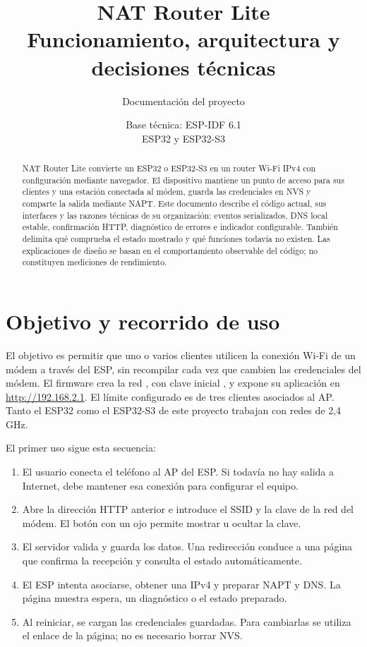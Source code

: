 \documentclass[11pt,a4paper]{article}
\title{\textbf{NAT Router Lite}\\[0.4em]
  \large Funcionamiento, arquitectura y decisiones técnicas}
\author{Documentación del proyecto}
\date{Base técnica: ESP-IDF 6.1\\ESP32 y ESP32-S3}
\newcommand{\code}[1]{\texttt{\detokenize{#1}}}
\begin{document}
\maketitle
\begin{abstract}
NAT Router Lite convierte un ESP32 o ESP32-S3 en un router Wi-Fi IPv4
con configuración mediante navegador. El dispositivo mantiene un punto
de acceso para sus clientes y una estación conectada al módem, guarda las
credenciales en NVS y comparte la salida mediante NAPT. Este documento
describe el código actual, sus interfaces y las razones técnicas de su
organización: eventos serializados, DNS local estable, confirmación HTTP,
diagnóstico de errores e indicador configurable. También delimita qué
comprueba el estado mostrado y qué funciones todavía no existen.
Las explicaciones de diseño se basan en el comportamiento observable del
código; no constituyen mediciones de rendimiento.
\end{abstract}
\tableofcontents
\clearpage

\section{Objetivo y recorrido de uso}
\label{sec:uso}

El objetivo es permitir que uno o varios clientes utilicen la conexión
Wi-Fi de un módem a través del ESP, sin recompilar cada vez que cambien
las credenciales del módem. El firmware crea la red \code{ESP32-NAT}, con
clave inicial \code{12345678}, y expone su aplicación en
\url{http://192.168.2.1}. El límite configurado es de tres clientes
asociados al AP. Tanto el ESP32 como el ESP32-S3 de este proyecto trabajan
con redes de 2,4 GHz.

El primer uso sigue esta secuencia:
\begin{enumerate}
  \item El usuario conecta el teléfono al AP del ESP. Si todavía no hay
  salida a Internet, debe mantener esa conexión para configurar el equipo.
  \item Abre la dirección HTTP anterior e introduce el SSID y la clave
  de la red del módem. El botón con un ojo permite mostrar u ocultar la clave.
  \item El servidor valida y guarda los datos. Una redirección conduce a
  una página que confirma la recepción y consulta el estado automáticamente.
  \item El ESP intenta asociarse, obtener una IPv4 y preparar NAPT y DNS.
  La página muestra espera, un diagnóstico o el estado preparado.
  \item Al reiniciar, se cargan las credenciales guardadas. Para cambiarlas
  se utiliza el enlace de la página; no es necesario borrar NVS.
\end{enumerate}
\end{document}
